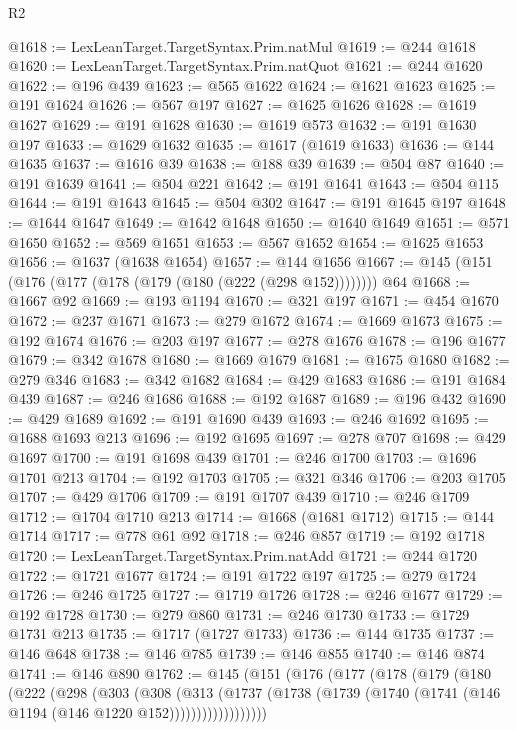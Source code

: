 \begin{lexlean}{R2}
\begin{coremodule}
@1618 := LexLeanTarget.TargetSyntax.Prim.natMul
@1619 := @244 @1618
@1620 := LexLeanTarget.TargetSyntax.Prim.natQuot
@1621 := @244 @1620
@1622 := @196 @439
@1623 := @565 @1622
@1624 := @1621 @1623
@1625 := @191 @1624
@1626 := @567 @197
@1627 := @1625 @1626
@1628 := @1619 @1627
@1629 := @191 @1628
@1630 := @1619 @573
@1632 := @191 @1630 @197
@1633 := @1629 @1632
@1635 := @1617 (@1619 @1633)
@1636 := @144 @1635
@1637 := @1616 @39
@1638 := @188 @39
@1639 := @504 @87
@1640 := @191 @1639
@1641 := @504 @221
@1642 := @191 @1641
@1643 := @504 @115
@1644 := @191 @1643
@1645 := @504 @302
@1647 := @191 @1645 @197
@1648 := @1644 @1647
@1649 := @1642 @1648
@1650 := @1640 @1649
@1651 := @571 @1650
@1652 := @569 @1651
@1653 := @567 @1652
@1654 := @1625 @1653
@1656 := @1637 (@1638 @1654)
@1657 := @144 @1656
@1667 := @145 (@151 (@176 (@177 (@178 (@179 (@180 (@222 (@298 @152)))))))) @64
@1668 := @1667 @92
@1669 := @193 @1194
@1670 := @321 @197
@1671 := @454 @1670
@1672 := @237 @1671
@1673 := @279 @1672
@1674 := @1669 @1673
@1675 := @192 @1674
@1676 := @203 @197
@1677 := @278 @1676
@1678 := @196 @1677
@1679 := @342 @1678
@1680 := @1669 @1679
@1681 := @1675 @1680
@1682 := @279 @346
@1683 := @342 @1682
@1684 := @429 @1683
@1686 := @191 @1684 @439
@1687 := @246 @1686
@1688 := @192 @1687
@1689 := @196 @432
@1690 := @429 @1689
@1692 := @191 @1690 @439
@1693 := @246 @1692
@1695 := @1688 @1693 @213
@1696 := @192 @1695
@1697 := @278 @707
@1698 := @429 @1697
@1700 := @191 @1698 @439
@1701 := @246 @1700
@1703 := @1696 @1701 @213
@1704 := @192 @1703
@1705 := @321 @346
@1706 := @203 @1705
@1707 := @429 @1706
@1709 := @191 @1707 @439
@1710 := @246 @1709
@1712 := @1704 @1710 @213
@1714 := @1668 (@1681 @1712)
@1715 := @144 @1714
@1717 := @778 @61 @92
@1718 := @246 @857
@1719 := @192 @1718
@1720 := LexLeanTarget.TargetSyntax.Prim.natAdd
@1721 := @244 @1720
@1722 := @1721 @1677
@1724 := @191 @1722 @197
@1725 := @279 @1724
@1726 := @246 @1725
@1727 := @1719 @1726
@1728 := @246 @1677
@1729 := @192 @1728
@1730 := @279 @860
@1731 := @246 @1730
@1733 := @1729 @1731 @213
@1735 := @1717 (@1727 @1733)
@1736 := @144 @1735
@1737 := @146 @648
@1738 := @146 @785
@1739 := @146 @855
@1740 := @146 @874
@1741 := @146 @890
@1762 := @145
    (@151
      (@176
        (@177
          (@178
            (@179
              (@180
                (@222
                  (@298
                    (@303
                      (@308
                        (@313
                          (@1737
                            (@1738
                              (@1739 (@1740 (@1741 (@146 @1194 (@146 @1220 @152))))))))))))))))))

\end{coremodule}
\end{lexlean}
